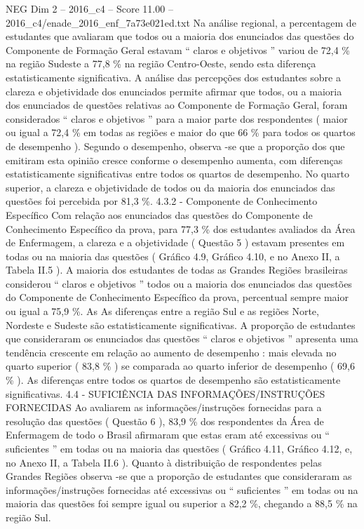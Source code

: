 \begin{textsample}{NEG Dim 2 – 2016\_c4 – Score 11.00 – 2016\_c4/enade\_2016\_enf\_7a73e021ed.txt}
Na análise regional, a percentagem de estudantes que avaliaram que todos ou a maioria dos enunciados das questões do Componente de Formação Geral estavam “ claros e objetivos ” variou de 72,4 \% na região Sudeste a 77,8 \% na região Centro-Oeste, sendo esta diferença estatisticamente significativa.
A análise das percepções dos estudantes sobre a clareza e objetividade dos enunciados permite afirmar que todos, ou a maioria dos enunciados de questões relativas ao Componente de Formação Geral, foram considerados “ claros e objetivos ” para a maior parte dos respondentes ( maior ou igual a 72,4 \% em todas as regiões e maior do que 66 \% para todos os quartos de desempenho ).
Segundo o desempenho, observa -se que a proporção dos que emitiram esta opinião cresce conforme o desempenho aumenta, com diferenças estatisticamente significativas entre todos os quartos de desempenho.
No quarto superior, a clareza e objetividade de todos ou da maioria dos enunciados das questões foi percebida por 81,3 \%. 4.3.2 - Componente de Conhecimento Específico Com relação aos enunciados das questões do Componente de Conhecimento Específico da prova, para 77,3 \% dos estudantes avaliados da Área de Enfermagem, a clareza e a objetividade ( Questão 5 ) estavam presentes em todas ou na maioria das questões ( Gráfico 4.9, Gráfico 4.10, e no Anexo II, a Tabela II.5 ).
A maioria dos estudantes de todas as Grandes Regiões brasileiras considerou “ claros e objetivos ” todos ou a maioria dos enunciados das questões do Componente de Conhecimento Específico da prova, percentual sempre maior ou igual a 75,9 \%.
As As diferenças entre a região Sul e as regiões Norte, Nordeste e Sudeste são estatisticamente significativas.
A proporção de estudantes que consideraram os enunciados das questões “ claros e objetivos ” apresenta uma tendência crescente em relação ao aumento de desempenho : mais elevada no quarto superior ( 83,8 \% ) se comparada ao quarto inferior de desempenho ( 69,6 \% ).
As diferenças entre todos os quartos de desempenho são estatisticamente significativas. 4.4 - SUFICIÊNCIA DAS INFORMAÇÕES/INSTRUÇÕES FORNECIDAS Ao avaliarem as informações/instruções fornecidas para a resolução das questões ( Questão 6 ), 83,9 \% dos respondentes da Área de Enfermagem de todo o Brasil afirmaram que estas eram até excessivas ou “ suficientes ” em todas ou na maioria das questões ( Gráfico 4.11, Gráfico 4.12, e, no Anexo II, a Tabela II.6 ).
Quanto à distribuição de respondentes pelas Grandes Regiões observa -se que a proporção de estudantes que consideraram as informações/instruções fornecidas até excessivas ou “ suficientes ” em todas ou na maioria das questões foi sempre igual ou superior a 82,2 \%, chegando a 88,5 \% na região Sul.

\end{textsample}
